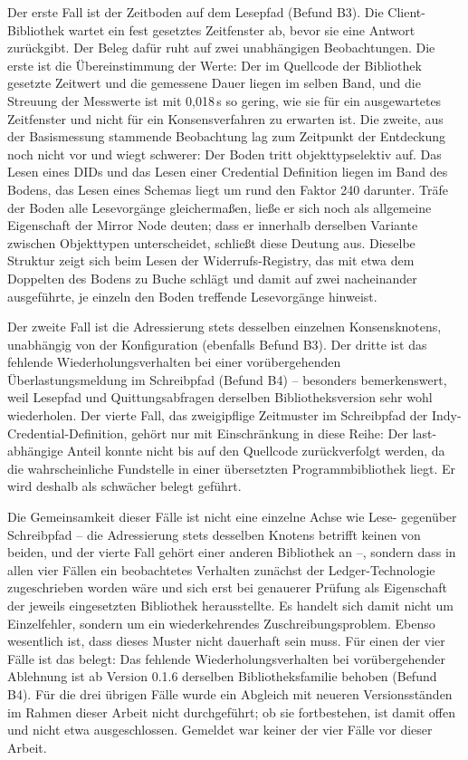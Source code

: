 Der erste Fall ist der Zeitboden auf dem Lesepfad (Befund B3). Die Client-Bibliothek wartet ein fest gesetztes Zeitfenster ab, bevor sie eine Antwort zurückgibt. Der Beleg dafür ruht auf zwei unabhängigen Beobachtungen. Die erste ist die Übereinstimmung der Werte: Der im Quellcode der Bibliothek gesetzte Zeitwert und die gemessene Dauer liegen im selben Band, und die Streuung der Messwerte ist mit 0,018\,s so gering, wie sie für ein ausgewartetes Zeitfenster und nicht für ein Konsensverfahren zu erwarten ist. Die zweite, aus der Basismessung stammende Beobachtung lag zum Zeitpunkt der Entdeckung noch nicht vor und wiegt schwerer: Der Boden tritt objekttypselektiv auf. Das Lesen eines DIDs und das Lesen einer Credential Definition liegen im Band des Bodens, das Lesen eines Schemas liegt um rund den Faktor 240 darunter. Träfe der Boden alle Lesevorgänge gleichermaßen, ließe er sich noch als allgemeine Eigenschaft der Mirror Node deuten; dass er innerhalb derselben Variante zwischen Objekttypen unterscheidet, schließt diese Deutung aus. Dieselbe Struktur zeigt sich beim Lesen der Widerrufs-Registry, das mit etwa dem Doppelten des Bodens zu Buche schlägt und damit auf zwei nacheinander ausgeführte, je einzeln den Boden treffende Lesevorgänge hinweist.

Der zweite Fall ist die Adressierung stets desselben einzelnen Konsensknotens, unabhängig von der Konfiguration (ebenfalls Befund B3). Der dritte ist das fehlende Wiederholungsverhalten bei einer vorübergehenden Überlastungsmeldung im Schreibpfad (Befund B4) -- besonders bemerkenswert, weil Lesepfad und Quittungsabfragen derselben Bibliotheksversion sehr wohl wiederholen. Der vierte Fall, das zweigipflige Zeitmuster im Schreibpfad der Indy-Credential-Definition, gehört nur mit Einschränkung in diese Reihe: Der last-abhängige Anteil konnte nicht bis auf den Quellcode zurückverfolgt werden, da die wahrscheinliche Fundstelle in einer übersetzten Programmbibliothek liegt. Er wird deshalb als schwächer belegt geführt.

Die Gemeinsamkeit dieser Fälle ist nicht eine einzelne Achse wie Lese- gegenüber Schreibpfad -- die Adressierung stets desselben Knotens betrifft keinen von beiden, und der vierte Fall gehört einer anderen Bibliothek an --, sondern dass in allen vier Fällen ein beobachtetes Verhalten zunächst der Ledger-Technologie zugeschrieben worden wäre und sich erst bei genauerer Prüfung als Eigenschaft der jeweils eingesetzten Bibliothek herausstellte. Es handelt sich damit nicht um Einzelfehler, sondern um ein wiederkehrendes Zuschreibungsproblem. Ebenso wesentlich ist, dass dieses Muster nicht dauerhaft sein muss. Für einen der vier Fälle ist das belegt: Das fehlende Wiederholungsverhalten bei vorübergehender Ablehnung ist ab Version 0.1.6 derselben Bibliotheksfamilie behoben (Befund B4). Für die drei übrigen Fälle wurde ein Abgleich mit neueren Versionsständen im Rahmen dieser Arbeit nicht durchgeführt; ob sie fortbestehen, ist damit offen und nicht etwa ausgeschlossen. Gemeldet war keiner der vier Fälle vor dieser Arbeit.

